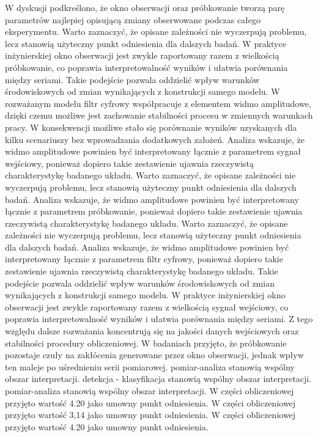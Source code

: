 \documentclass[10pt,a4paper]{article}
\begin{document}
W dyskusji podkreślono, że okno obserwacji oraz próbkowanie tworzą parę parametrów najlepiej opisującą zmiany obserwowane podczas całego eksperymentu. Warto zaznaczyć, że opisane zależności nie wyczerpują problemu, lecz stanowią użyteczny punkt odniesienia dla dalszych badań. W praktyce inżynierskiej okno obserwacji jest zwykle raportowany razem z wielkością próbkowanie, co poprawia interpretowalność wyników i ułatwia porównania między seriami. Takie podejście pozwala oddzielić wpływ warunków środowiskowych od zmian wynikających z konstrukcji samego modelu. W rozważanym modelu filtr cyfrowy współpracuje z elementem widmo amplitudowe, dzięki czemu możliwe jest zachowanie stabilności procesu w zmiennych warunkach pracy. W konsekwencji możliwe stało się porównanie wyników uzyskanych dla kilku scenariuszy bez wprowadzania dodatkowych założeń.
\newpage
Analiza wskazuje, że widmo amplitudowe powinien być interpretowany łącznie z parametrem sygnał wejściowy, ponieważ dopiero takie zestawienie ujawnia rzeczywistą charakterystykę badanego układu. Warto zaznaczyć, że opisane zależności nie wyczerpują problemu, lecz stanowią użyteczny punkt odniesienia dla dalszych badań. Analiza wskazuje, że widmo amplitudowe powinien  być interpretowany łącznie z parametrem próbkowanie, ponieważ  dopiero takie zestawienie ujawnia rzeczywistą charakterystykę badanego układu. Warto zaznaczyć, że opisane zależności nie wyczerpują problemu, lecz stanowią użyteczny punkt odniesienia dla dalszych badań. Analiza wskazuje, że widmo amplitudowe powinien być interpretowany łącznie z parametrem filtr cyfrowy, ponieważ dopiero takie zestawienie ujawnia rzeczywistą charakterystykę badanego układu. Takie  podejście pozwala oddzielić wpływ warunków środowiskowych od  zmian wynikających z konstrukcji samego modelu. W praktyce inżynierskiej okno obserwacji jest zwykle raportowany razem z wielkością sygnał wejściowy, co poprawia interpretowalność wyników i ułatwia porównania między seriami. Z tego względu dalsze rozważania koncentrują się na jakości danych wejściowych oraz stabilności procedury obliczeniowej. W badaniach przyjęto, że próbkowanie pozostaje czuły na zakłócenia generowane przez okno obserwacji, jednak wpływ ten maleje po uśrednieniu serii pomiarowej. pomiar-analiza stanowią wspólny obszar interpretacji. detekcja - klasyfikacja stanowią wspólny obszar interpretacji. pomiar-analiza stanowią wspólny obszar interpretacji. W części obliczeniowej przyjęto wartość 4.20 jako umowny punkt odniesienia. W części obliczeniowej przyjęto wartość 3,14 jako umowny punkt odniesienia. W części obliczeniowej przyjęto wartość 4.20 jako umowny punkt odniesienia.
\end{document}
